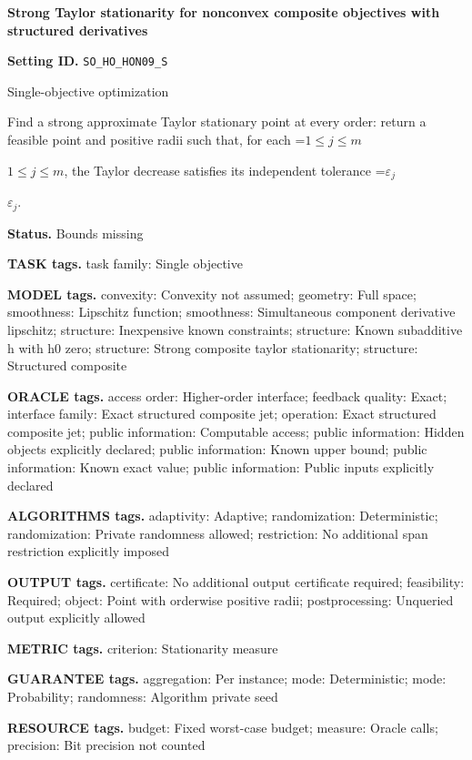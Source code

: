 \documentclass[10pt,a4paper]{article}
\newcommand{\AtlasMath}[1]{\par\begingroup\centering\setbox0=\hbox{$\displaystyle #1$}\ifdim\wd0>1.4\linewidth\typeout{ATLAS WIDE FORMULA: \the\wd0}\fi\ifdim\wd0>\linewidth\resizebox{\linewidth}{!}{\box0}\else\box0\fi\par\endgroup}
\newcommand{\AtlasInlineMath}[1]{\begingroup\setbox0=\hbox{$#1$}\ifdim\wd0>.4\linewidth\endgroup\AtlasMath{#1}\else\endgroup$#1$\fi}
\begin{document}
\raggedright

{\LARGE\bfseries\sffamily\color{AtlasNavy} Strong Taylor stationarity for nonconvex composite objectives with structured derivatives\par}\vspace{5pt}
\textbf{Setting ID.} \texttt{SO\_\allowbreak{}HO\_\allowbreak{}HON09\_\allowbreak{}S}

Single-objective optimization

Find a strong approximate Taylor stationary point at every order: return a feasible point and positive radii such that, for each \AtlasInlineMath{1\le j\le m}, the Taylor decrease satisfies its independent tolerance \AtlasInlineMath{\varepsilon_j}.

\textbf{Status.} Bounds missing

\textbf{TASK tags.} task family: Single objective

\textbf{MODEL tags.} convexity: Convexity not assumed; geometry: Full space; smoothness: Lipschitz function; smoothness: Simultaneous component derivative lipschitz; structure: Inexpensive known constraints; structure: Known subadditive h with h0 zero; structure: Strong composite taylor stationarity; structure: Structured composite

\textbf{ORACLE tags.} access order: Higher-order interface; feedback quality: Exact; interface family: Exact structured composite jet; operation: Exact structured composite jet; public information: Computable access; public information: Hidden objects explicitly declared; public information: Known upper bound; public information: Known exact value; public information: Public inputs explicitly declared

\textbf{ALGORITHMS tags.} adaptivity: Adaptive; randomization: Deterministic; randomization: Private randomness allowed; restriction: No additional span restriction explicitly imposed

\textbf{OUTPUT tags.} certificate: No additional output certificate required; feasibility: Required; object: Point with orderwise positive radii; postprocessing: Unqueried output explicitly allowed

\textbf{METRIC tags.} criterion: Stationarity measure

\textbf{GUARANTEE tags.} aggregation: Per instance; mode: Deterministic; mode: Probability; randomness: Algorithm private seed

\textbf{RESOURCE tags.} budget: Fixed worst-case budget; measure: Oracle calls; precision: Bit precision not counted
\end{document}
